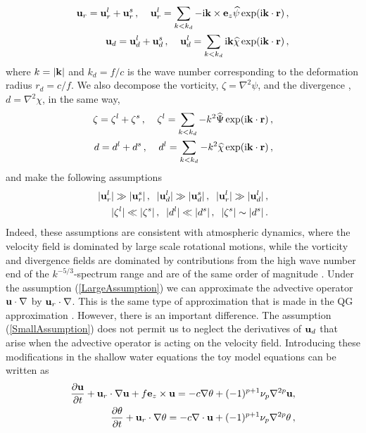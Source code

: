\begin{eqnarray}
{\bf u}_r = {\bf u}_r^{l} + {\bf u}_r^{s} \, , \;\;\;\;
{\bf u}_r^{l} = \sum_{k < k_{d}} -{\mbox{i}} {\bf k} \times {\bf e}_z \widehat{\psi}  \exp({\mbox{i}}{\bf k}\cdot {\bf r}) \, , \\
{\bf u}_d = {\bf u}_d^{l} + {\bf u}_d^{s} \, , \;\;\;\;
{\bf u}_d^{l} = \sum_{k < k_{d}} {\mbox{i}} {\bf k} \widehat{\chi}  \exp({\mbox{i}}{\bf k}\cdot {\bf r}) \, ,
\end{eqnarray}
where $ k = |{\bf k} | $ and $ k_d = f/c $ is the wave number corresponding to the deformation radius $ r_d = c/f $.  We also decompose the vorticity, $ \zeta = \nabla^{2} \psi $, and the divergence , $ d = \nabla^2 \chi $, in the same way,
\begin{eqnarray}
\zeta = \zeta^l + \zeta^s \, , \;\;\;\;  \zeta ^{l} = \sum_{k < k_{d}} -k^2 \widehat{\Psi} \exp({\mbox{i}}{\bf k}\cdot {\bf r}) \, , \\
d = d^l + d^s \, , \;\;\;\;  d ^{l} = \sum_{k < k_{d}} -k^2 \widehat{\chi} \exp({\mbox{i}}{\bf k}\cdot {\bf r}) \, ,
\end{eqnarray}
and make the following assumptions
\begin{eqnarray} \label{LargeAssumption}
 | {\bf u}_r^{l} | \gg  | {\bf u}_r ^{s} | \, , \;\; | {\bf u}_d^{l} | \gg  | {\bf u}_d ^{s} | \, , \;\;
 | {\bf u}_r^{l} | \gg | {\bf u}_d^{l} | \, , \\  \label{SmallAssumption}
 | \zeta^{l} | \ll | \zeta^{s} | \, , \;\;   | d^{l} | \ll | d^{s} | \, , \;\;
 | \zeta^{s} | \sim | d^{s} | \, .
\end{eqnarray}
Indeed, these assumptions are consistent with atmospheric dynamics, where the velocity field is dominated by large scale rotational motions, while the vorticity and divergence fields are dominated by contributions from the high wave number end of the $ k^{-5/3} $-spectrum range and are of the same order of magnitude
\citep{Lindborg:2015}.
Under the assumption (\ref{LargeAssumption})   we can approximate the advective operator $ {\bf u} \cdot \nabla $ by
$ {\bf u}_r \cdot \nabla $. This is the same type of approximation that is made in the QG approximation \citep{Charney1971}.
However, there is an important difference. The assumption (\ref{SmallAssumption}) does not permit us to neglect the derivatives of $ {\bf u}_d $ that arise when the advective operator is acting on the velocity field.
Introducing these modifications in the shallow water equations the toy model equations can be written as
\begin{eqnarray} \label{V2}
\frac{\partial {\bf u}} {\partial t} + {\bf u}_r \cdot \nabla {\bf u} + f {\bf e}_z \times {\bf u} = -c \nabla \theta + (-1)^{p+1} \nu_p \nabla^{2p} {\bf u} , \\ \label{Theta}
\frac{\partial \theta}{\partial t}
+ {\bf u}_r \cdot \nabla \theta   = -  c\nabla \cdot {\bf u} + (-1)^{p+1} \nu_p \nabla^{2p} {\theta}\, ,
\end{eqnarray}
